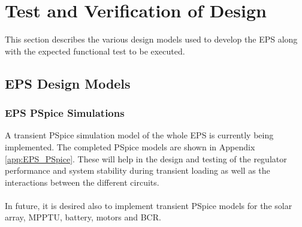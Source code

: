 \section{Test and Verification of Design}
\label{sec:test_verification}
This section describes the various design models used to develop the \ac{EPS} along with the expected functional test to be executed.
%
\subsection{EPS Design Models}
%
\subsubsection{EPS PSpice Simulations}
A transient PSpice simulation model of the whole \ac{EPS} is currently being implemented. The completed PSpice models are shown in Appendix \ref{app:EPS_PSpice}. These will help in the design and testing of the regulator performance and system stability during transient loading as well as the interactions between the different circuits.
\\
\\
In future, it is desired also to implement transient PSpice models for the solar array\cite{Castaner}, \ac{MPPTU}, battery\cite{gold}, motors and \ac{BCR}.
%
